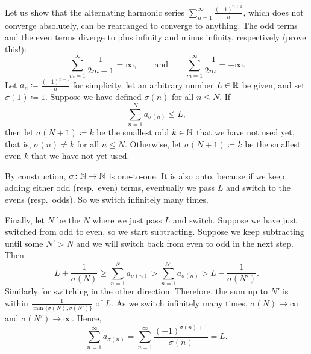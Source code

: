 \begin{example} \label{example:harmonsumanything}
Let us show that the alternating harmonic series
$\sum_{n=1}^\infty \frac{{(-1)}^{n+1}}{n}$, which does not converge absolutely, can be
rearranged to converge to anything.
The odd terms and the even terms diverge to
plus infinity and minus infinity, respectively (prove this!):
\begin{equation*}
\sum_{m=1}^\infty \frac{1}{2m-1} = \infty, \qquad \text{and} \qquad
\sum_{m=1}^\infty \frac{-1}{2m} = -\infty .
\end{equation*}
Let $a_n \coloneqq \frac{{(-1)}^{n+1}}{n}$ for simplicity, 
let an arbitrary number $L \in {\mathbb{R}}$ be given, and set $\sigma(1) \coloneqq 1$.
Suppose we have
defined $\sigma(n)$ for all $n \leq N$.  If
\begin{equation*}
\sum_{n=1}^N a_{\sigma(n)} \leq L ,
\end{equation*}
then let $\sigma(N+1) \coloneqq k$ be the smallest odd $k \in {\mathbb{N}}$
that we have not used yet,
that is, $\sigma(n) \neq k$ for all $n \leq N$.
Otherwise, let $\sigma(N+1) \coloneqq k$ 
be the smallest even $k$ that we have not yet used.

By construction, $\sigma \colon {\mathbb{N}} \to {\mathbb{N}}$ is one-to-one.
It is also onto, because if we keep adding either odd (resp.\ even) terms,
eventually we pass $L$ and switch
to the evens (resp.\ odds).  So we switch infinitely many times.

Finally, let $N$ be the $N$ where we just pass $L$ and switch.
Suppose we have just switched from odd to even, so we start
subtracting.
Suppose we keep subtracting until some
$N' > N$ and we will switch back from even to odd in the next step.
Then
\begin{equation*}
L + \frac{1}{\sigma(N)} \geq \sum_{n=1}^{N} a_{\sigma(n)}
> \sum_{n=1}^{N'} a_{\sigma(n)} > L- \frac{1}{\sigma(N')}.
\end{equation*}
Similarly for switching in the other direction.
Therefore,
the sum up to $N'$ is within $\frac{1}{\min \{ \sigma(N), \sigma(N') \}}$
of $L$.  As
we switch infinitely many times, $\sigma(N) \to \infty$
and $\sigma(N') \to \infty$. Hence,
\begin{equation*}
\sum_{n=1}^\infty a_{\sigma(n)} = 
\sum_{n=1}^\infty \frac{{(-1)}^{\sigma(n)+1}}{\sigma(n)} = L .
\end{equation*}


\end{example}
